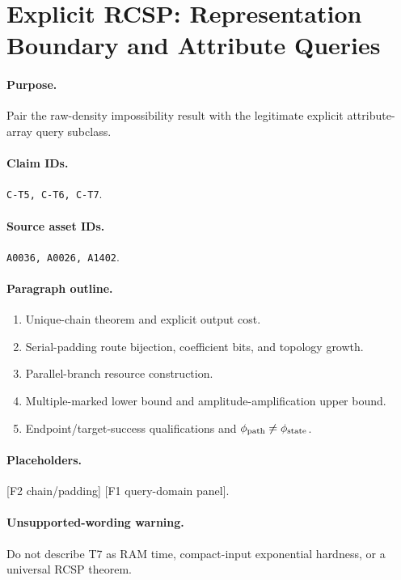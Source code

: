 \section{Explicit RCSP: Representation Boundary and Attribute Queries}

\paragraph{Purpose.}
Pair the raw-density impossibility result with the legitimate explicit
attribute-array query subclass.

\paragraph{Claim IDs.}
\texttt{C-T5, C-T6, C-T7}.

\paragraph{Source asset IDs.}
\texttt{A0036, A0026, A1402}.

\paragraph{Paragraph outline.}
\begin{enumerate}
  \item Unique-chain theorem and explicit output cost.
  \item Serial-padding route bijection, coefficient bits, and topology growth.
  \item Parallel-branch resource construction.
  \item Multiple-marked lower bound and amplitude-amplification upper bound.
  \item Endpoint/target-success qualifications and $\phi_{\rm path}\ne
  \phi_{\rm state}$.
\end{enumerate}

\paragraph{Placeholders.}
[F2 chain/padding] [F1 query-domain panel].

\paragraph{Unsupported-wording warning.}
Do not describe T7 as RAM time, compact-input exponential hardness, or a
universal RCSP theorem.
